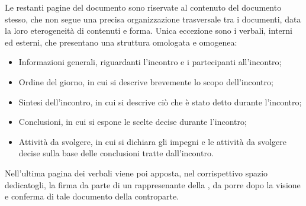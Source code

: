Le restanti pagine del documento sono riservate al contenuto del documento stesso, che non segue una precisa organizzazione trasversale tra i documenti, data la loro eterogeneità di contenuti e forma.
Unica eccezione sono i verbali, interni ed esterni, che presentano una struttura omologata e omogenea:
\begin{itemize}
    \item Informazioni generali, riguardanti l'incontro e i partecipanti all'incontro;
    \item Ordine del giorno, in cui si descrive brevemente lo scopo dell'incontro;
    \item Sintesi dell'incontro, in cui si descrive ciò che è stato detto durante l'incontro;
    \item Conclusioni, in cui si espone le scelte decise durante l'incontro;
    \item Attività da svolgere, in cui si dichiara gli impegni e le attività da svolgere decise sulla base delle conclusioni tratte dall'incontro.
\end{itemize}
Nell'ultima pagina dei verbali viene poi apposta, nel corrispettivo spazio dedicatogli, la firma da parte di un rappresenante della , da porre dopo la visione e conferma di tale documento della controparte.

